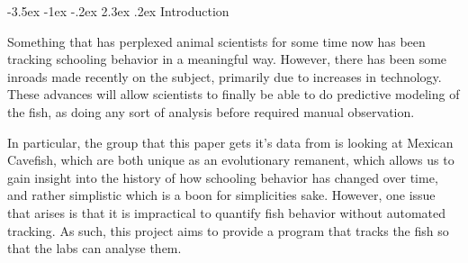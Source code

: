 \documentclass{article}
\makeatletter
\renewcommand\section{\clearpage\newpage\@startsection {section}{1}{\z@}%
	{-3.5ex \@plus -1ex \@minus -.2ex}%
	{2.3ex \@plus.2ex}%
	{\normalfont\Large\bfseries}}
\makeatother
\begin{document}
\singlespace
\newpage

\setlength{\parindent}{1em}



\section{Introduction}
\label{introduction}

Something that has perplexed animal scientists for some time now has been tracking schooling behavior in a meaningful way. However, there has been some inroads made recently on the subject, primarily due to increases in technology. These advances will allow scientists to finally be able to do predictive modeling of the fish, as doing any sort of analysis before required manual observation.

In particular, the group that this paper gets it's data from is looking at Mexican Cavefish, which are both unique as an evolutionary remanent, which allows us to gain insight into the history of how schooling behavior has changed over time, and rather simplistic which is a boon for simplicities sake. However, one issue that arises is that it is impractical to quantify fish behavior without automated tracking. As such, this project aims to provide a program that tracks the fish so that the labs can analyse them.
\end{document}
